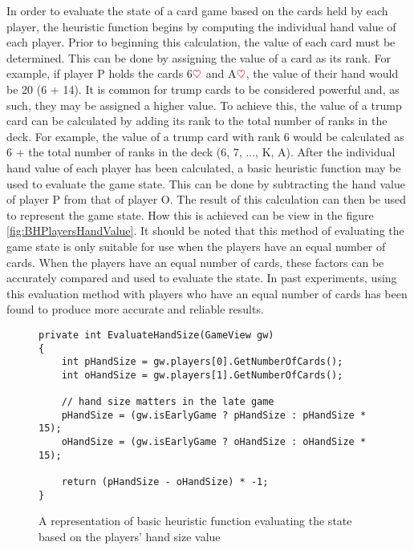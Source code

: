In order to evaluate the state of a card game based on the cards held by each player, the heuristic function begins by computing the individual hand value of each player. Prior to beginning this calculation, the value of each card must be determined. This can be done by assigning the value of a card as its rank. For example, if player P holds the cards 6$\textcolor{red}{\heartsuit}$ and A$\textcolor{red}{\heartsuit}$, the value of their hand would be 20 (6 + 14). It is common for trump cards to be considered powerful and, as such, they may be assigned a higher value. To achieve this, the value of a trump card can be calculated by adding its rank to the total number of ranks in the deck. For example, the value of a trump card with rank 6 would be calculated as 6 + the total number of ranks in the deck (6, 7, ..., K, A). After the individual hand value of each player has been calculated, a basic heuristic function may be used to evaluate the game state. This can be done by subtracting the hand value of player P from that of player O. The result of this calculation can then be used to represent the game state. How this is achieved can be view in the figure \ref{fig:BHPlayersHandValue}. It should be noted that this method of evaluating the game state is only suitable for use when the players have an equal number of cards. When the players have an equal number of cards, these factors can be accurately compared and used to evaluate the state. In past experiments, using this evaluation method with players who have an equal number of cards has been found to produce more accurate and reliable results.

\begin{figure}[h]
\captionsetup{justification=centering}
\begin{lstlisting}
private int EvaluateHandSize(GameView gw)
{
	int pHandSize = gw.players[0].GetNumberOfCards();
	int oHandSize = gw.players[1].GetNumberOfCards();

	// hand size matters in the late game
	pHandSize = (gw.isEarlyGame ? pHandSize : pHandSize * 15);
	oHandSize = (gw.isEarlyGame ? oHandSize : oHandSize * 15);

	return (pHandSize - oHandSize) * -1;
}
\end{lstlisting}
\caption{A representation of basic heuristic function evaluating the state based on the players' hand size value}
\label{fig:BHPlayerHandSize}
\end{figure}


